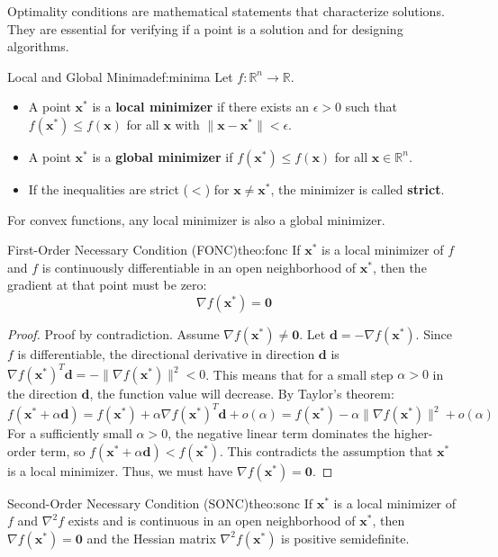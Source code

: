 \documentclass{MathNote}
\begin{document}
Optimality conditions are mathematical statements that characterize solutions. They are essential for verifying if a point is a solution and for designing algorithms.

\begin{definition}{Local and Global Minima}{def:minima}
	Let $f: \mathbb{R}^n \to \mathbb{R}$.
	\begin{itemize}
		\item A point $\bm{x}^*$ is a \textbf{local minimizer} if there exists an $\epsilon > 0$ such that $f(\bm{x}^*) \le f(\bm{x})$ for all $\bm{x}$ with $\|\bm{x} - \bm{x}^*\| < \epsilon$.
		\item A point $\bm{x}^*$ is a \textbf{global minimizer} if $f(\bm{x}^*) \le f(\bm{x})$ for all $\bm{x} \in \mathbb{R}^n$.
		\item If the inequalities are strict ($<$) for $\bm{x} \ne \bm{x}^*$, the minimizer is called \textbf{strict}.
	\end{itemize}
\end{definition}

For convex functions, any local minimizer is also a global minimizer.

\begin{theorem}{First-Order Necessary Condition (FONC)}{theo:fonc}
	If $\bm{x}^*$ is a local minimizer of $f$ and $f$ is continuously differentiable in an open neighborhood of $\bm{x}^*$, then the gradient at that point must be zero:
	$$
	\nabla f(\bm{x}^*) = \bm{0}
	$$
\end{theorem}
\begin{proof}
	Proof by contradiction. Assume $\nabla f(\bm{x}^*) \ne \bm{0}$. Let $\bm{d} = -\nabla f(\bm{x}^*)$. Since $f$ is differentiable, the directional derivative in direction $\bm{d}$ is $\nabla f(\bm{x}^*)^T \bm{d} = -\|\nabla f(\bm{x}^*)\|^2 < 0$. This means that for a small step $\alpha > 0$ in the direction $\bm{d}$, the function value will decrease. By Taylor's theorem:
	$$ f(\bm{x}^* + \alpha \bm{d}) = f(\bm{x}^*) + \alpha \nabla f(\bm{x}^*)^T \bm{d} + o(\alpha) = f(\bm{x}^*) - \alpha \|\nabla f(\bm{x}^*)\|^2 + o(\alpha) $$
	For a sufficiently small $\alpha > 0$, the negative linear term dominates the higher-order term, so $f(\bm{x}^* + \alpha \bm{d}) < f(\bm{x}^*)$. This contradicts the assumption that $\bm{x}^*$ is a local minimizer. Thus, we must have $\nabla f(\bm{x}^*) = \bm{0}$.
\end{proof}


\begin{theorem}{Second-Order Necessary Condition (SONC)}{theo:sonc}
	If $\bm{x}^*$ is a local minimizer of $f$ and $\nabla^2 f$ exists and is continuous in an open neighborhood of $\bm{x}^*$, then $\nabla f(\bm{x}^*) = \bm{0}$ and the Hessian matrix $\nabla^2 f(\bm{x}^*)$ is positive semidefinite.
\end{theorem}
\end{document}
